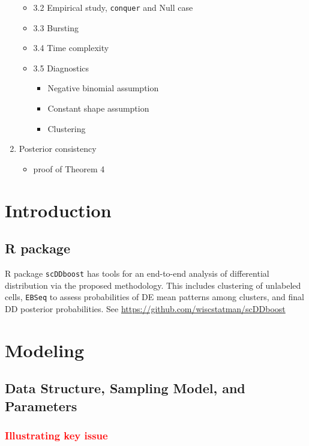 \documentclass[aoas,preprint]{imsart}
\begin{document}
\begin{enumerate}
\begin{itemize}
   \item 3.2 Empirical study, \verb+conquer+ and Null case
   \item 3.3 Bursting
   \item 3.4 Time complexity
   \item 3.5 Diagnostics
    \begin{itemize}
    \item Negative binomial assumption
    \item Constant shape assumption
    \item Clustering 
    \end{itemize}
   \end{itemize}
\item Posterior consistency
  \begin{itemize}
   \item proof of Theorem 4
  \end{itemize}
\end{enumerate}


\clearpage

\section{Introduction}


\subsection{R package}

 R package \texttt{scDDboost} has tools for an end-to-end analysis of differential distribution
via the proposed methodology. This includes clustering of unlabeled cells, \verb+EBSeq+ to assess
 probabilities of DE mean patterns among clusters,  and final DD posterior probabilities. 
See \url {https://github.com/wiscstatman/scDDboost}



\section{Modeling}

\subsection{Data Structure, Sampling Model, and Parameters}

\subsubsection*{\textcolor{red}{{\bf Illustrating key issue}}}
\end{document}

